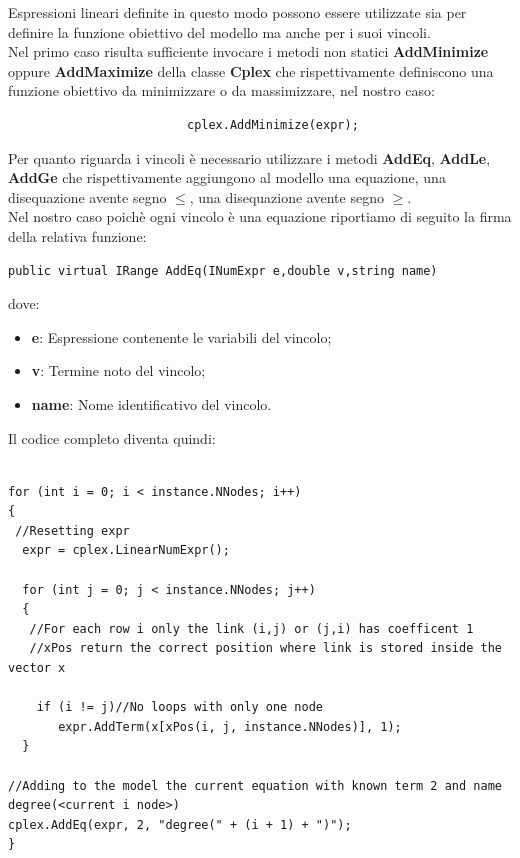 \documentclass[11pt]{article}
\begin{document}
Espressioni lineari definite in questo modo possono essere utilizzate sia per definire la funzione obiettivo del modello ma anche per i suoi vincoli.\\
Nel primo caso risulta sufficiente invocare i metodi non statici \textbf{AddMinimize} oppure \textbf{AddMaximize} della classe \textbf{Cplex} che rispettivamente definiscono una funzione obiettivo da minimizzare o da massimizzare, nel nostro caso:            


\begin{lstlisting}
                         cplex.AddMinimize(expr);         
\end{lstlisting}

Per quanto riguarda i vincoli è necessario utilizzare i metodi \textbf{AddEq}, \textbf{AddLe}, \textbf{AddGe} che rispettivamente aggiungono al modello una equazione, una disequazione avente segno $\leq$, una disequazione avente segno $\geq$.\\
Nel nostro caso poichè ogni vincolo è una equazione riportiamo di seguito la firma della relativa funzione:

\begin{lstlisting}
public virtual IRange AddEq(INumExpr e,double v,string name)
\end{lstlisting}

dove:

\begin{itemize}
    \item \textbf{e}: Espressione contenente le variabili del vincolo;
    \item \textbf{v}: Termine noto del vincolo;
    \item \textbf{name}: Nome identificativo del vincolo.
\end{itemize}

Il codice completo diventa quindi:

\begin{lstlisting}

for (int i = 0; i < instance.NNodes; i++)
{
 //Resetting expr
  expr = cplex.LinearNumExpr();

  for (int j = 0; j < instance.NNodes; j++)
  {
   //For each row i only the link (i,j) or (j,i) has coefficent 1
   //xPos return the correct position where link is stored inside the vector x
    
    if (i != j)//No loops with only one node
       expr.AddTerm(x[xPos(i, j, instance.NNodes)], 1);               
  }

//Adding to the model the current equation with known term 2 and name degree(<current i node>)
cplex.AddEq(expr, 2, "degree(" + (i + 1) + ")");
}

\end{lstlisting}
\end{document}
